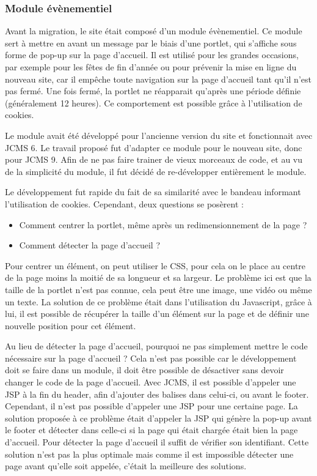 \documentclass[12pt,a4paper]{article}
\begin{document}
\subsubsection{Module évènementiel}
Avant la migration, le site était composé d'un module évènementiel. Ce module sert à mettre en avant un message par le biais d'une portlet, qui s'affiche sous forme de pop-up sur la page d'accueil. Il est utilisé pour les grandes occasions, par exemple pour les fêtes de fin d'année ou pour prévenir la mise en ligne du nouveau site, car il empêche toute navigation sur la page d'accueil tant qu'il n'est pas fermé. Une fois fermé, la portlet ne réapparait qu'après une période définie (généralement 12 heures). Ce comportement est possible grâce à l'utilisation de cookies.\par 
Le module avait été développé pour l'ancienne version du site et fonctionnait avec \gls{JCMS} 6. Le travail proposé fut d'adapter ce module pour le nouveau site, donc pour \gls{JCMS} 9. Afin de ne pas faire trainer de vieux morceaux de code, et au vu de la simplicité du module, il fut décidé de re-développer entièrement le module.\par 
Le développement fut rapide du fait de sa similarité avec le bandeau informant l'utilisation de cookies. Cependant, deux questions se posèrent : 
\begin{itemize}
\item Comment centrer la portlet, même après un redimensionnement de la page ?
\item Comment détecter la page d'accueil ?
\end{itemize}\par
Pour centrer un élément, on peut utiliser le \gls{CSS}, pour cela on le place au centre de la page moins la moitié de sa longueur et sa largeur. Le problème ici est que la taille de la portlet n'est pas connue, cela peut être une image, une vidéo ou même un texte. La solution de ce problème était dans l'utilisation du Javascript, grâce à lui, il est possible de récupérer la taille d'un élément sur la page et de définir une nouvelle position pour cet élément.\par 
Au lieu de détecter la page d'accueil, pourquoi ne pas simplement mettre le code nécessaire sur la page d'accueil ? Cela n'est pas possible car le développement doit se faire dans un module, il doit être possible de désactiver sans devoir changer le code de la page d'accueil. Avec \gls{JCMS}, il est possible d'appeler une JSP à la fin du header, afin d'ajouter des balises dans celui-ci, ou avant le footer. Cependant, il n'est pas possible d'appeler une JSP pour une certaine page. La solution proposée à ce problème était d'appeler la JSP qui génère la pop-up avant le footer et détecter dans celle-ci si la page qui était chargée était bien la page d'accueil. Pour détecter la page d'accueil il suffit de vérifier son identifiant. Cette solution n'est pas la plus optimale mais comme il est impossible détecter une page avant qu'elle soit appelée, c'était la meilleure des solutions.\par 
\end{document}
